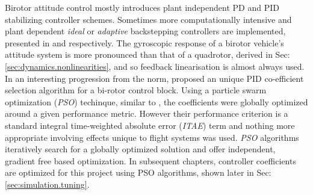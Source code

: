 Birotor attitude control mostly introduces plant independent PD \cite{obliquepitch} and PID \cite{tiltrotorUAV} stabilizing controller schemes. Sometimes more computationally intensive and plant dependent \emph{ideal} or \emph{adaptive} backstepping controllers are implemented, presented in \cite{smalltwotilting,tpheonix} and \cite{adaptivebackstep} respectively. The gyroscopic response of a birotor vehicle's attitude system is more pronounced than that of a quadrotor, derived in Sec:\ref{sec:dynamics.nonlinearities}, and so feedback linearisation is almost always used. In an interesting progression from the norm, \cite{autopilotPSO} proposed an unique PID co-efficient selection algorithm for a bi-rotor control block. Using a particle swarm optimization (\emph{PSO}) techinque, similar to \cite{adaptivepso}, the coefficients were globally optimized around a given performance metric. However their performance criterion is a standard integral time-weighted absolute error (\emph{ITAE}) term and nothing more appropriate involving effects unique to flight systems was used. \emph{PSO} algorithms iteratively search for a globally optimized solution and offer independent, gradient free based optimization. In subsequent chapters, controller coefficients are optimized for this project using PSO algorithms, shown later in Sec:\ref{sec:simulation.tuning}.
\par
